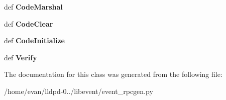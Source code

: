 \begin{DoxyCompactItemize}
\item 
def {\bfseries \-Code\-Marshal}\label{classevent__rpcgen_1_1_entry_bytes_ae994601ffc7e740cede6cb32d6d4f55a}

\item 
def {\bfseries \-Code\-Clear}\label{classevent__rpcgen_1_1_entry_bytes_a7b18b6858614ca342000830c02218696}

\item 
def {\bfseries \-Code\-Initialize}\label{classevent__rpcgen_1_1_entry_bytes_a24ae658809888439abef27b3633d22a0}

\item 
def {\bfseries \-Verify}\label{classevent__rpcgen_1_1_entry_bytes_a893afc80bb2301a1f65c3a46e79580e0}

\end{DoxyCompactItemize}


\-The documentation for this class was generated from the following file\-:\begin{DoxyCompactItemize}
\item 
/home/evan/lldpd-\/0../libevent/event\-\_\-rpcgen.\-py\end{DoxyCompactItemize}
